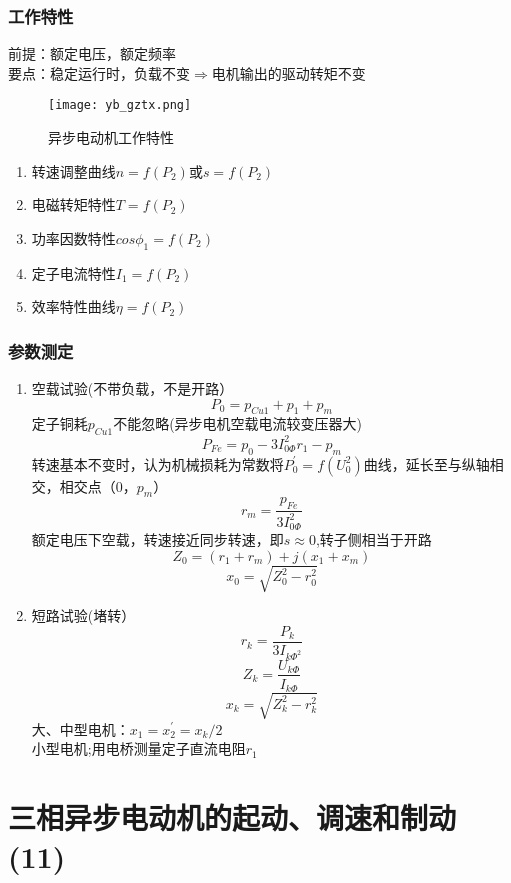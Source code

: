\documentclass[blue]{elegantnote}
\begin{document}
\subsection{工作特性}
{\color{thid}前提：额定电压，额定频率}\\
{\color{blue}要点：稳定运行时，负载不变$\Rightarrow$电机输出的驱动转矩不变}
\begin{figure}[!hbtp]
	\centering
	\texttt{[image: yb\_gztx.png]}
	\caption{异步电动机工作特性\label{figur:yb_gztx}}
\end{figure}
\begin{enumerate}
	\item 转速调整曲线$n=f(P_2)$或$s=f(P_2)$
	
	\item 电磁转矩特性$T=f(P_2)$
	
	\item 功率因数特性$cos\phi_1=f(P_2)$
	
	\item 定子电流特性$I_1=f(P_2)$
	
	\item 效率特性曲线$\eta=f(P_2)$
	
\end{enumerate}
\subsection{参数测定}
\begin{enumerate}
	\item 空载试验{\color{thid}(不带负载，不是开路）}
	$$P_0=p_{Cu1}+p_1+p_m$$
	{\color{thid}定子铜耗$p_{Cu1}$不能忽略(异步电机空载电流较变压器大)}
	$$P_{Fe}=p_0-3I_{0\Phi}^2r_1-p_m$$
	{\color{thid}转速基本不变时，认为机械损耗为常数}将$P_0^{'}=f(U_0^{2})$曲线，延长至与纵轴相交，相交点（0，$p_m$）\\
	$$r_m=\frac{p_{Fe}}{3I_{0\Phi}^2}$$
	{\color{thid}额定电压下空载，转速接近同步转速，即$s\approx 0$},转子侧相当于开路
	$$Z_0=(r_1+r_m)+j(x_1+x_m)$$
	$$x_0=\sqrt{Z_0^2-r_0^2}$$
	\item 短路试验{\color{thid}(堵转）}
	$$r_k=\frac{P_k}{3I_{k\Phi^2}}$$
	$$Z_k=\frac{U_{k\Phi}}{I_{k\Phi}}$$
	$$x_k=\sqrt{Z_k^2-r_k^2}$$
	{\color{blue}大、中型电机：$x_1=x_2^{'}=x_k/2$\\
		小型电机;用电桥测量定子直流电阻$r_1$}
\end{enumerate}


\chapter{三相异步电动机的起动、调速和制动(11)}
\end{document}
